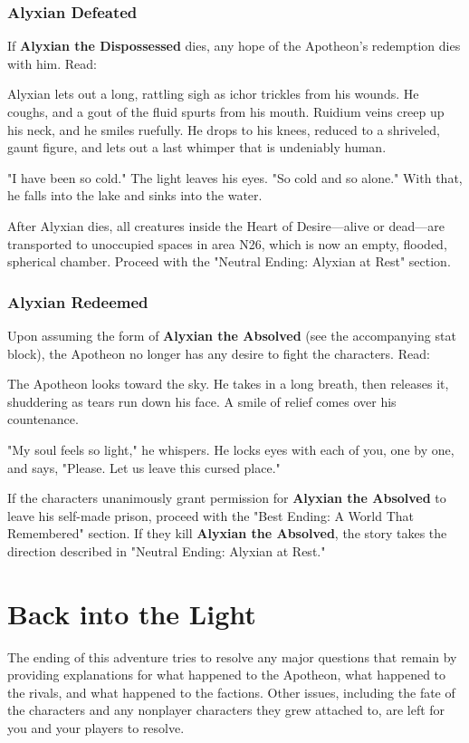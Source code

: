 \documentclass[10pt,a4paper,twoside,fancy,bg=print,twocolumn,openany,nodeprecatedcode]{dndbook}
\begin{document}
\subsubsection{Alyxian Defeated}
If \textbf{Alyxian the Dispossessed} dies, any hope of the Apotheon's redemption dies with him. Read:

\begin{DndReadAloud}{}
Alyxian lets out a long, rattling sigh as ichor trickles from his wounds. He coughs, and a gout of the fluid spurts from his mouth. Ruidium veins creep up his neck, and he smiles ruefully. He drops to his knees, reduced to a shriveled, gaunt figure, and lets out a last whimper that is undeniably human.

"I have been so cold." The light leaves his eyes. "So cold and so alone." With that, he falls into the lake and sinks into the water.

\end{DndReadAloud}

After Alyxian dies, all creatures inside the Heart of Desire—alive or dead—are transported to unoccupied spaces in area N26, which is now an empty, flooded, spherical chamber. Proceed with the "Neutral Ending: Alyxian at Rest" section.

\subsubsection{Alyxian Redeemed}
Upon assuming the form of \textbf{Alyxian the Absolved} (see the accompanying stat block), the Apotheon no longer has any desire to fight the characters. Read:

\begin{DndReadAloud}{}
The Apotheon looks toward the sky. He takes in a long breath, then releases it, shuddering as tears run down his face. A smile of relief comes over his countenance.

"My soul feels so light," he whispers. He locks eyes with each of you, one by one, and says, "Please. Let us leave this cursed place."

\end{DndReadAloud}

If the characters unanimously grant permission for \textbf{Alyxian the Absolved} to leave his self-made prison, proceed with the "Best Ending: A World That Remembered" section. If they kill \textbf{Alyxian the Absolved}, the story takes the direction described in "Neutral Ending: Alyxian at Rest."

\section{Back into the Light}
The ending of this adventure tries to resolve any major questions that remain by providing explanations for what happened to the Apotheon, what happened to the rivals, and what happened to the factions. Other issues, including the fate of the characters and any nonplayer characters they grew attached to, are left for you and your players to resolve.
\end{document}
